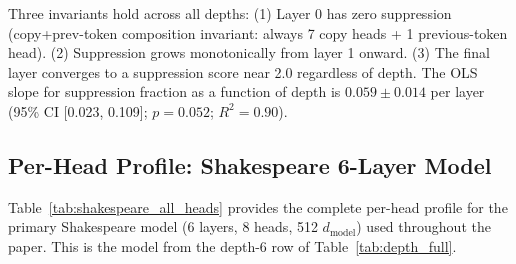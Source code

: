 \noindent Three invariants hold across all depths: (1) Layer 0 has zero suppression (copy+prev-token
composition invariant: always 7 copy heads + 1 previous-token head). (2) Suppression grows
monotonically from layer 1 onward. (3) The final layer converges to a suppression score near 2.0
regardless of depth. The OLS slope for suppression fraction as a function of depth is
$0.059 \pm 0.014$ per layer (95\% CI [0.023, 0.109]; $p = 0.052$; $R^2 = 0.90$).

\subsection{Per-Head Profile: Shakespeare 6-Layer Model}
\label{app:shakespeare_heads}

Table~\ref{tab:shakespeare_all_heads} provides the complete per-head profile for the primary
Shakespeare model (6 layers, 8 heads, 512 $d_{\text{model}}$) used throughout the paper.
This is the model from the depth-6 row of Table~\ref{tab:depth_full}.

